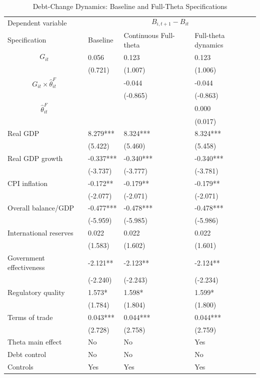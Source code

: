 \begin{table}[H]\centering
\begin{threeparttable}
\caption{Debt-Change Dynamics: Baseline and Full-Theta Specifications}
\label{tab:debt_change_combined_fulltheta}
\scriptsize
\begin{tabularx}{\textwidth}{lYYY}
\toprule
Dependent variable &  \\
\cmidrule(lr){2-4}
Specification & Baseline & Continuous Full-theta & Full-theta dynamics \\
\midrule
$$G_{it}$$ & 0.056 & 0.123 & 0.123 \\
 & (0.721) & (1.007) & (1.006) \\
$$G_{it}\times\widehat{\theta}^{F}_{it}$$ &  & -0.044 & -0.044 \\
 &  & (-0.865) & (-0.863) \\
$$\widehat{\theta}^{F}_{it}$$ &  &  & 0.000 \\
 &  &  & (0.017) \\
Real GDP & 8.279*** & 8.324*** & 8.324*** \\
 & (5.422) & (5.460) & (5.458) \\
Real GDP growth & -0.337*** & -0.340*** & -0.340*** \\
 & (-3.737) & (-3.777) & (-3.781) \\
CPI inflation & -0.172** & -0.179** & -0.179** \\
 & (-2.077) & (-2.071) & (-2.071) \\
Overall balance/GDP & -0.477*** & -0.478*** & -0.478*** \\
 & (-5.959) & (-5.985) & (-5.986) \\
International reserves & 0.022 & 0.022 & 0.022 \\
 & (1.583) & (1.602) & (1.601) \\
Government effectiveness & -2.121** & -2.123** & -2.124** \\
 & (-2.240) & (-2.243) & (-2.234) \\
Regulatory quality & 1.573* & 1.598* & 1.599* \\
 & (1.784) & (1.804) & (1.800) \\
Terms of trade & 0.043*** & 0.044*** & 0.044*** \\
 & (2.728) & (2.758) & (2.759) \\
\midrule
Theta main effect & No & No & Yes \\
Debt control & No & No & No \\
Controls & Yes & Yes & Yes \\

\end{tabularx}
\end{threeparttable}
\end{table}
